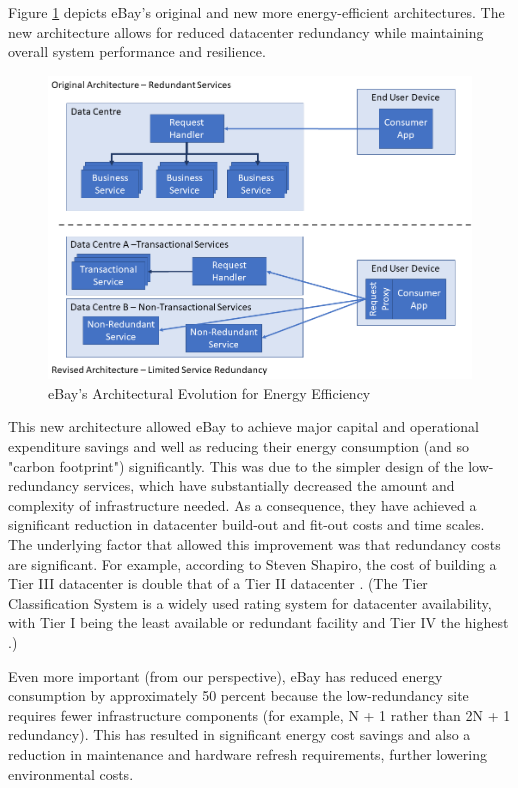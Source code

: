 Figure \ref{figure:styles} depicts eBay's original and new more energy-efficient architectures. The new architecture allows for reduced datacenter redundancy while maintaining overall system performance and resilience.

\begin{figure}
\centering
\includegraphics[width=\textwidth]{Figures/principles-styles}
\caption{eBay's Architectural Evolution for Energy Efficiency}
\label{figure:styles}
\end{figure}

This new architecture allowed eBay to achieve major capital and operational expenditure savings and well as reducing their energy consumption (and so "carbon footprint") significantly. This was due to the simpler design of the low-redundancy services, which have substantially decreased the amount and complexity of infrastructure needed.  As a consequence, they have achieved a significant reduction in datacenter build-out and fit-out costs and time scales. The underlying factor that allowed this improvement was that redundancy costs are significant. For example, according to Steven Shapiro, the cost of building a Tier III datacenter is double that of a Tier II datacenter \cite{shapiro2015-datacentre-mythsrealities}. (The Tier Classification System is a widely used rating system for datacenter availability, with Tier I being the least available or redundant facility and Tier IV the highest \cite{uptime2015-tierclassification}.)

Even more important (from our perspective), eBay has reduced energy consumption by approximately 50 percent because the low-redundancy site requires fewer infrastructure components (for example, N + 1 rather than 2N + 1 redundancy). This has resulted in  significant energy cost savings and also a reduction in maintenance and hardware refresh requirements, further lowering environmental costs.

